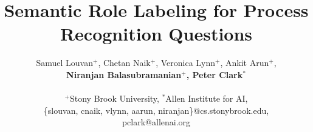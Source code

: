 \documentclass[11pt,a4paper]{article}
\title{Semantic Role Labeling for Process Recognition Questions}
\author{
  Samuel Louvan$^+$,
  Chetan Naik$^+$,
  Veronica Lynn$^+$,
  Ankit Arun$^+$,\\
  \textbf{Niranjan  Balasubramanian$^+$,
  Peter Clark$^*$} \\
  \\
  $^+$Stony Brook University, 
    $^*$Allen Institute for AI, \\
  \{slouvan, cnaik, vlynn, aarun, niranjan\}@cs.stonybrook.edu,\\
  pclark@allenai.org
}
\begin{document}
\maketitle









\small

\end{document}
